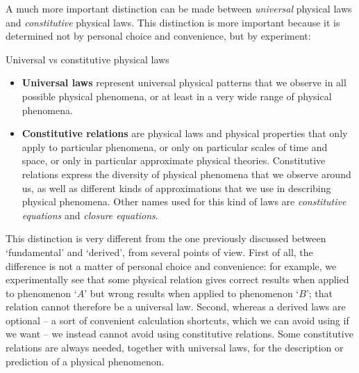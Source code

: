 \documentclass[a4paper,12pt,%
onecolumn,oneside,titlepage,%
british%
]{memoir}
\renewcommand*{\|}[1][]{\nonscript\:#1\vert\nonscript\:\mathopen{}}
\begin{document}
A much more important distinction can be made between \emph{universal} physical laws and \emph{constitutive} physical laws. This distinction is more important because it  is determined not by personal choice and convenience, but by experiment:
\begin{definition}{Universal vs constitutive physical laws}
  \begin{itemize}
  \item\textbf{Universal laws} represent universal physical patterns that we observe in all possible physical phenomena, or at least in a very wide range of physical phenomena.

  \item\textbf{Constitutive relations} are physical laws and physical properties that only apply to particular phenomena, or only on particular scales of time and space, or only in particular approximate physical theories. Constitutive relations express the diversity of physical phenomena that we observe around us, as well as different kinds of approximations that we use in describing physical phenomena. Other names used for this kind of laws are \emph{constitutive equations} and \emph{closure equations}.
  \end{itemize}
\end{definition}

This distinction is very different from the one previously discussed between \enquote*{fundamental} and \enquote*{derived}, from several points of view. First of all, the difference is not a matter of personal choice and convenience: for example, we experimentally see that some physical relation gives correct results when applied to phenomenon \enquote*{$A$} but wrong results when applied to phenomenon \enquote*{$B$}; that relation cannot therefore be a universal law. Second, whereas a derived laws are optional -- a sort of convenient calculation shortcuts, which we can avoid using if we want -- we instead cannot avoid using constitutive relations. Some constitutive relations are always needed, together with universal laws, for the description or prediction of a physical phenomenon.

\end{document}
